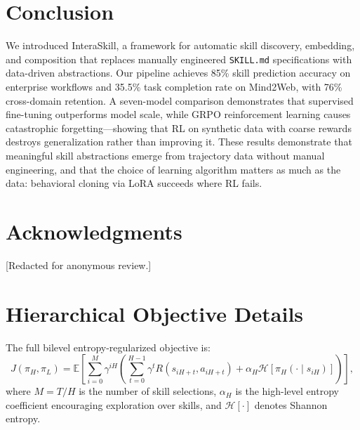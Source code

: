 \documentclass{article}
\begin{document}
\section{Conclusion}

We introduced InteraSkill, a framework for automatic skill discovery, embedding, and composition that replaces manually engineered \texttt{SKILL.md} specifications with data-driven abstractions. Our pipeline achieves 85\% skill prediction accuracy on enterprise workflows and 35.5\% task completion rate on Mind2Web, with 76\% cross-domain retention. A seven-model comparison demonstrates that supervised fine-tuning outperforms model scale, while GRPO reinforcement learning causes catastrophic forgetting---showing that RL on synthetic data with coarse rewards destroys generalization rather than improving it. These results demonstrate that meaningful skill abstractions emerge from trajectory data without manual engineering, and that the choice of learning algorithm matters as much as the data: behavioral cloning via LoRA succeeds where RL fails.

\section*{Acknowledgments}
[Redacted for anonymous review.]




\newpage
\appendix
\section{Hierarchical Objective Details}
\label{app:hierarchical_objective}

The full bilevel entropy-regularized objective is:
\begin{equation}
J(\pi_H, \pi_L) = \mathbb{E}\left[\sum_{i=0}^{M} \gamma^{iH} \left( \sum_{t=0}^{H-1} \gamma^t R(s_{iH+t}, a_{iH+t}) + \alpha_H \mathcal{H}[\pi_H(\cdot \mid s_{iH})] \right) \right],
\end{equation}
where $M = T/H$ is the number of skill selections, $\alpha_H$ is the high-level entropy coefficient encouraging exploration over skills, and $\mathcal{H}[\cdot]$ denotes Shannon entropy.
\end{document}
